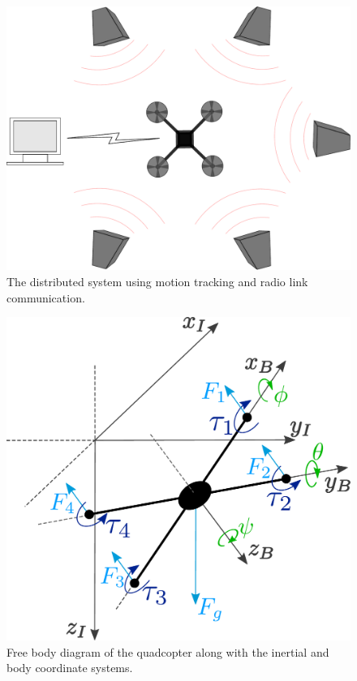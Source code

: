 \begin{figure}
\includegraphics[width=0.85\linewidth]{figures/system.pdf}
\caption{The distributed system using motion tracking and radio link communication.}
\end{figure}

\begin{figure}
\includegraphics[width=0.85\linewidth]{figures/droneDiagram.pdf}
\caption{Free body diagram of the quadcopter along with the inertial and body coordinate systems.}
\end{figure}